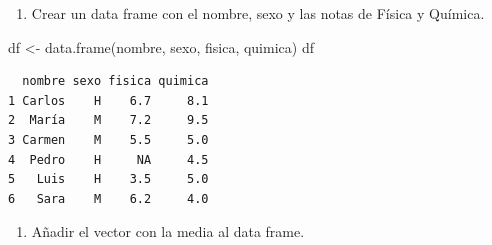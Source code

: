 \documentclass[
  a4paper,
]{scrreport}
\newenvironment{Shaded}{\begin{snugshade}}{\end{snugshade}}
\newcommand{\FunctionTok}[1]{\textcolor[rgb]{0.28,0.35,0.67}{#1}}
\newcommand{\NormalTok}[1]{\textcolor[rgb]{0.00,0.23,0.31}{#1}}
\newcommand{\OtherTok}[1]{\textcolor[rgb]{0.00,0.23,0.31}{#1}}
\providecommand{\tightlist}{%
  \setlength{\itemsep}{0pt}\setlength{\parskip}{0pt}}\usepackage{longtable,booktabs,array}
\theoremstyle{definition}
\theoremstyle{definition}
\theoremstyle{remark}
\begin{document}
\begin{enumerate}
\def\labelenumi{\alph{enumi}.}
\setcounter{enumi}{5}
\tightlist
\item
  Crear un data frame con el nombre, sexo y las notas de Física y
  Química.
\end{enumerate}

\begin{tcolorbox}[enhanced jigsaw, colback=white, opacityback=0, breakable, colframe=quarto-callout-note-color-frame, coltitle=black, bottomrule=.15mm, opacitybacktitle=0.6, toprule=.15mm, left=2mm, title=\textcolor{quarto-callout-note-color}{\faInfo}\hspace{0.5em}{Solución}, colbacktitle=quarto-callout-note-color!10!white, bottomtitle=1mm, titlerule=0mm, toptitle=1mm, arc=.35mm, rightrule=.15mm, leftrule=.75mm]

\begin{Shaded}
\begin{Highlighting}[]
\NormalTok{df }\OtherTok{\textless{}{-}} \FunctionTok{data.frame}\NormalTok{(nombre, sexo, fisica, quimica)}
\NormalTok{df}
\end{Highlighting}
\end{Shaded}

\begin{verbatim}
  nombre sexo fisica quimica
1 Carlos    H    6.7     8.1
2  María    M    7.2     9.5
3 Carmen    M    5.5     5.0
4  Pedro    H     NA     4.5
5   Luis    H    3.5     5.0
6   Sara    M    6.2     4.0
\end{verbatim}

\end{tcolorbox}

\begin{enumerate}
\def\labelenumi{\alph{enumi}.}
\setcounter{enumi}{6}
\tightlist
\item
  Añadir el vector con la media al data frame.
\end{enumerate}
\end{document}
